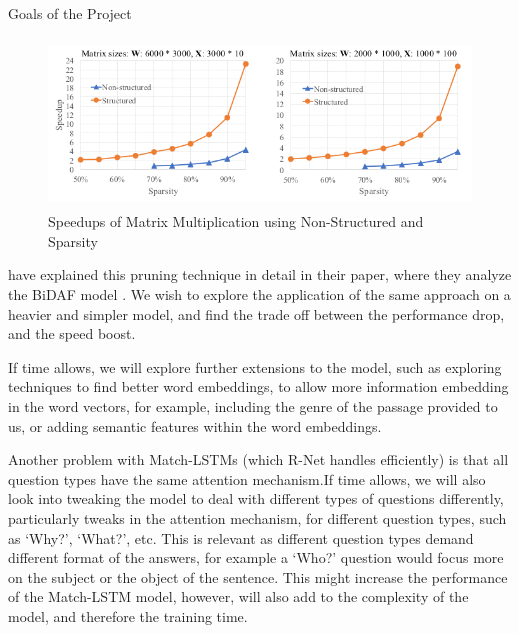 \documentclass{article}
\begin{document}
\begin{psection}{Goals of the Project}
	\begin{figure}[ht!]
		\centering
		\includegraphics[height=170px]{includes/iss-graph.png}
		\caption{Speedups of Matrix Multiplication using Non-Structured and Sparsity }
		\label{fig:iss-graph}
	\end{figure}

	 have explained this pruning technique in detail in their paper, where they analyze the BiDAF model \citep{bidaf}. We wish to explore the application of the same approach on a heavier and simpler model, and find the trade off between the performance drop, and the speed boost.

	If time allows, we will explore further extensions to the model, such as exploring techniques to find better word embeddings, to allow more information embedding in the word vectors, for example, including the genre of the passage provided to us, or adding semantic features within the word embeddings.

	Another problem with Match-LSTMs (which R-Net handles efficiently) is that all question types have the same attention mechanism.If time allows, we will also look into tweaking the model to deal with different types of questions differently, particularly tweaks in the attention mechanism, \ie for different question types, such as `Why?', `What?', etc.
	This is relevant as different question types demand different format of the answers, for example a `Who?' question would focus more on the subject or the object of the sentence. This might increase the performance of the Match-LSTM model, however, will also add to the complexity of the model, and therefore the training time.

\end{psection}

\newpage



\end{document}
